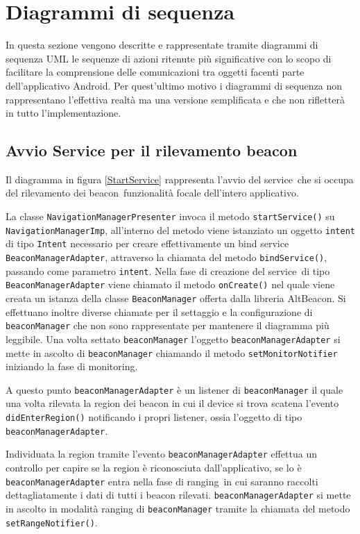 \documentclass[../DefinizioneDiProdotto.tex]{subfiles}
\begin{document}
\section{Diagrammi di sequenza}

	In questa sezione vengono descritte e rappresentate tramite diagrammi di sequenza UML le sequenze di azioni ritenute più significative con lo scopo di facilitare la comprensione delle comunicazioni tra oggetti facenti parte dell'applicativo Android\g. Per quest'ultimo motivo i diagrammi di sequenza non rappresentano l'effettiva realtà ma una versione semplificata e che non rifletterà in tutto l'implementazione.
	
	\subsection{Avvio Service per il rilevamento beacon}
	
	
		Il diagramma in figura \ref{StartService} rappresenta l'avvio del service\g\ che si occupa del rilevamento dei beacon\g\, funzionalità focale dell'intero applicativo.
		
	La classe \verb|NavigationManagerPresenter| invoca il metodo \verb|startService()| su \verb|NavigationManagerImp|, all'interno del metodo viene istanziato un oggetto \verb|intent| di tipo \verb|Intent| necessario per creare effettivamente un bind service\g\, \verb|BeaconManagerAdapter|, attraverso la chiamata del metodo \verb|bindService()|,  passando come parametro \verb|intent|. 
	Nella fase di creazione del service\g\ di tipo \verb|BeaconManagerAdapter| viene chiamato il metodo \verb|onCreate()| nel quale viene creata un istanza della classe \verb|BeaconManager| offerta dalla libreria AltBeacon\g. Si effettuano inoltre diverse chiamate per il settaggio e la configurazione di \verb|beaconManager| che non sono rappresentate per mantenere il diagramma più leggibile. Una volta settato \verb|beaconManager| l'oggetto \verb|beaconManagerAdapter| si mette in ascolto di \verb|beaconManager| chiamando il metodo \verb|setMonitorNotifier| iniziando la fase di monitoring\g.
	
	A questo punto \verb|beaconManagerAdapter| è un listener di \verb|beaconManager| il quale una volta rilevata la region dei beacon in cui il device si trova scatena l'evento \verb|didEnterRegion()| notificando i propri listener, ossia l'oggetto di tipo \verb|beaconManagerAdapter|.
	
	Individuata la region tramite l'evento \verb|beaconManagerAdapter| effettua un controllo per capire se la region è riconosciuta dall'applicativo, se lo è \verb|beaconManagerAdapter| entra nella fase di ranging\g\ in cui saranno raccolti dettagliatamente i dati di tutti i beacon rilevati. \verb|beaconManagerAdapter| si mette in ascolto in modalità ranging di \verb|beaconManager| tramite la chiamata del metodo \verb|setRangeNotifier()|.
	
\end{document}
